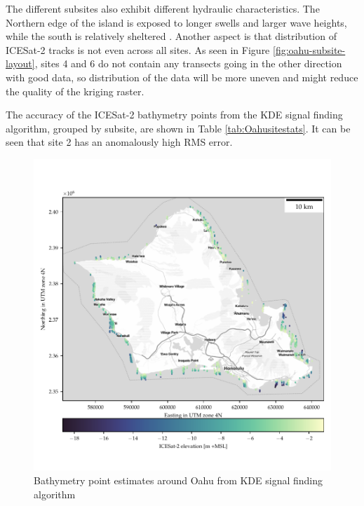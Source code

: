 The different subsites also exhibit different hydraulic characteristics. The Northern edge of the island is exposed to longer swells and larger wave heights, while the south is relatively sheltered \parencite{Vitousek2008a}. Another aspect is that distribution of ICESat-2 tracks is not even across all sites. As seen in Figure \ref{fig:oahu-subsite-layout}, sites 4 and 6 do not contain any transects going in the other direction with good data, so distribution of the data will be more uneven and might reduce the quality of the kriging raster.

The accuracy of the ICESat-2 bathymetry points from the KDE signal finding algorithm, grouped by subsite, are shown in Table \ref{tab:Oahusitestats}. It can be seen that site 2 has an anomalously high RMS error. 

\begin{figure}[htbp]
    \centering
    \includegraphics{figures/Oahu_all_sites_photon_points.pdf}
    \caption{Bathymetry point estimates around Oahu from KDE signal finding algorithm}
    \label{fig:oahu-photon-map}
\end{figure}


\begin{figure}
    \begin{floatrow}
    \end{floatrow}
\end{figure}


